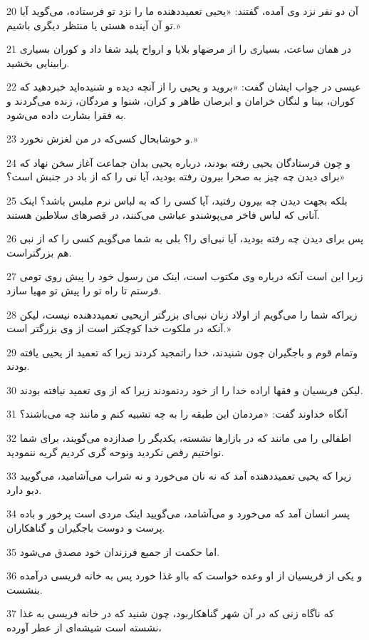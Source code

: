 \par 20 آن دو نفر نزد وی آمده، گفتند: «یحیی تعمید‌دهنده ما را نزد تو فرستاده، می‌گوید آیا تو آن آینده هستی یا منتظر دیگری باشیم.»
\par 21 در همان ساعت، بسیاری را از مرضهاو بلایا و ارواح پلید شفا داد و کوران بسیاری رابینایی بخشید.
\par 22 عیسی در جواب ایشان گفت: «بروید و یحیی را از آنچه دیده و شنیده‌اید خبردهید که کوران، بینا و لنگان خرامان و ابرصان طاهر و کران، شنوا و مردگان، زنده می‌گردند و به فقرا بشارت داده می‌شود.
\par 23 و خوشابحال کسی‌که در من لغزش نخورد.»
\par 24 و چون فرستادگان یحیی رفته بودند، درباره یحیی بدان جماعت آغاز سخن نهاد که «برای دیدن چه چیز به صحرا بیرون رفته بودید، آیا نی را که از باد در جنبش است؟
\par 25 بلکه بجهت دیدن چه بیرون رفتید، آیا کسی را که به لباس نرم ملبس باشد؟ اینک آنانی که لباس فاخر می‌پوشندو عیاشی می‌کنند، در قصرهای سلاطین هستند.
\par 26 پس برای دیدن چه رفته بودید، آیا نبی‌ای را؟ بلی به شما می‌گویم کسی را که از نبی هم بزرگتراست.
\par 27 زیرا این است آنکه درباره وی مکتوب است، اینک من رسول خود را پیش روی تومی فرستم تا راه تو را پیش تو مهیا سازد.
\par 28 زیراکه شما را می‌گویم از اولاد زنان نبی‌ای بزرگتر ازیحیی تعمید‌دهنده نیست، لیکن آنکه در ملکوت خدا کوچکتر است از وی بزرگتر است.»
\par 29 وتمام قوم و باجگیران چون شنیدند، خدا راتمجید کردند زیرا که تعمید از یحیی یافته بودند.
\par 30 لیکن فریسیان و فقها اراده خدا را از خود ردنمودند زیرا که از وی تعمید نیافته بودند.
\par 31 آنگاه خداوند گفت: «مردمان این طبقه را به چه تشبیه کنم و مانند چه می‌باشند؟
\par 32 اطفالی را می مانند که در بازارها نشسته، یکدیگر را صدازده می‌گویند، برای شما نواختیم رقص نکردید ونوحه گری کردیم گریه ننمودید.
\par 33 زیرا که یحیی تعمید‌دهنده آمد که نه نان می‌خورد و نه شراب می‌آشامید، می‌گویید دیو دارد.
\par 34 پسر انسان آمد که می‌خورد و می‌آشامد، می‌گویید اینک مردی است پرخور و باده پرست و دوست باجگیران و گناهکاران.
\par 35 اما حکمت از جمیع فرزندان خود مصدق می‌شود.
\par 36 و یکی از فریسیان از او وعده خواست که بااو غذا خورد پس به خانه فریسی درآمده بنشست.
\par 37 که ناگاه زنی که در آن شهر گناهکاربود، چون شنید که در خانه فریسی به غذا نشسته است شیشه‌ای از عطر آورده،
